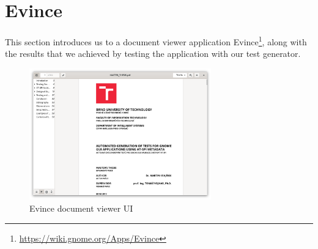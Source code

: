 



\section{Evince}\label{evince}
This section introduces us to a document viewer application Evince\footnote{\url{https://wiki.gnome.org/Apps/Evince}}, along with the results that we achieved by testing the application with our test generator. 

\begin{figure}[H]
	\centering
	\includegraphics[width=0.7\textwidth,clip]{obrazky-figures/evince.png}
	\caption{Evince document viewer UI}
	\label{evince_gui}
\end{figure}

